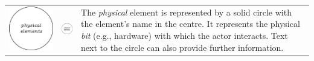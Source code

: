 \begin{longtable}{|m{}|m{}|m{}|}
    \\\hline
    \centering
    \includegraphics[width=0.75\linewidth]{chapters/4-MDC_model_application/image/bvl-physicalelement-o.png}
    &
    \centering
    \includegraphics[width=0.75\linewidth]{chapters/4-MDC_model_application/image/bvl-physicalelement.png}
    & 
    The \textit{physical} element is represented by a solid circle with the element's name in the centre. It represents the physical \textit{bit} (e.g., hardware) with which the actor interacts. Text next to the circle can also provide further information.

\end{longtable}
